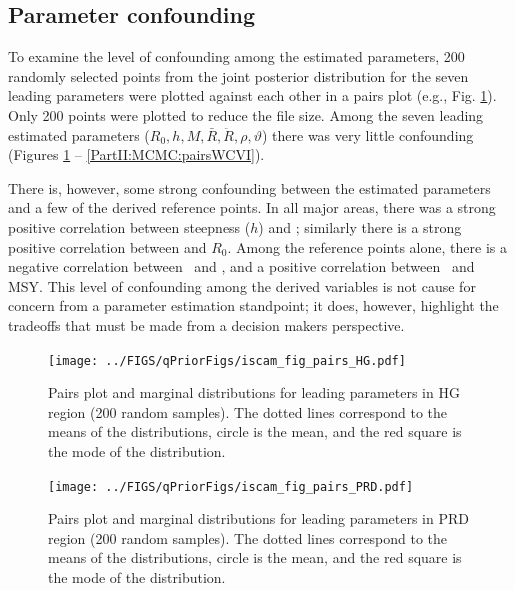 \subsection{Parameter confounding}

To examine the level of confounding among the estimated parameters, 200 randomly selected points from the joint posterior distribution for the seven leading parameters were plotted against each other in a pairs plot (e.g., Fig. \ref{PartII:MCMC:pairsHG}). Only 200 points were plotted to reduce the file size.   Among the seven leading estimated parameters ($R_0,h,M,\bar{R},\ddot{R}, \rho, \vartheta$) there was very little confounding (Figures \ref{PartII:MCMC:pairsHG} -- \ref{PartII:MCMC:pairsWCVI}).

There is, however, some strong confounding between the estimated parameters and a few of the derived reference points.  In all major areas, there was a strong positive correlation between steepness ($h$) and \fmsy; similarly there is a strong positive correlation between \bo and $R_0$.  Among the reference points alone, there is a negative correlation between \bmsy\ and \fmsy, and a positive correlation between \fmsy\ and MSY.  This level of confounding among the derived variables is not cause for concern  from a parameter estimation standpoint; it does, however,  highlight the tradeoffs that must be made from a decision makers perspective.


\begin{figure}[!tbp]
	\texttt{[image: ../FIGS/qPriorFigs/iscam\_fig\_pairs\_HG.pdf]}\\
	\caption{Pairs plot and marginal distributions for leading parameters in HG region (200 random samples).  The dotted lines correspond to the means of the distributions, circle is the mean, and the red square is the mode of the distribution.}\label{PartII:MCMC:pairsHG}
\end{figure}


\begin{figure}[!tbp]
	\texttt{[image: ../FIGS/qPriorFigs/iscam\_fig\_pairs\_PRD.pdf]}\\
	\caption{Pairs plot and marginal distributions for leading parameters in PRD region (200 random samples).  The dotted lines correspond to the means of the distributions, circle is the mean, and the red square is the mode of the distribution.}\label{PartII:MCMC:pairsPRD}
\end{figure}

